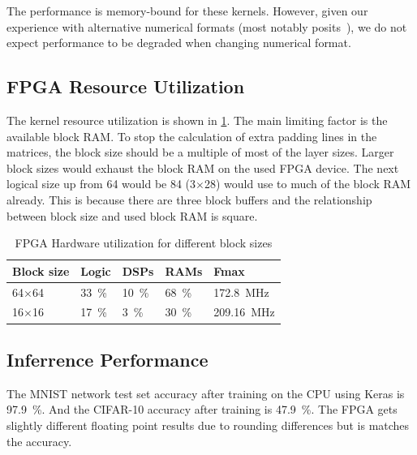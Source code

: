 \documentclass[techrep,english]{ipsj} %
\begin{document}
{The performance is memory-bound for these kernels. However, given our experience with alternative numerical formats (most notably posits~\cite{podobasposit}), we do not expect performance to be degraded when changing numerical format.

\subsection{FPGA Resource Utilization}
The kernel resource utilization is shown in \cref{tab:fpga-util}.
The main limiting factor is the available block RAM.
To stop the calculation of extra padding lines in the matrices, the block size should be a multiple of most of the layer sizes.
Larger block sizes would exhaust the block RAM on the used FPGA device.
The next logical size up from \num{64} would be \num{84} (\num{3}\(\times\)\num{28}) would use to much of the block RAM already.
This is because there are three block buffers and the relationship between block size and used block RAM is square.

\begin{table}[h]
  \centering
  \caption{FPGA Hardware utilization for different block sizes}\label{tab:fpga-util}
  \begin{tabular}{lllll}
    \toprule
    \textbf{Block size} & \textbf{Logic} & \textbf{DSPs} & \textbf{RAMs} & \textbf{Fmax} \\
    \midrule    
    64$\times$64 & \SI{33}{\percent} & \SI{10}{\percent} & \SI{68}{\percent} & \SI{172.8}{\mega\hertz}  \\ %
    16$\times$16 & \SI{17}{\percent} & \SI{3}{\percent} & \SI{30}{\percent} & \SI{209.16}{\mega\hertz}  \\ %
    \bottomrule
  \end{tabular}
\end{table}

\subsection{Inferrence Performance}
The MNIST network test set accuracy after training on the CPU using Keras is \SI{97.9}{\percent}.
And the CIFAR-10 accuracy after training is \SI{47.9}{\percent}.
The FPGA gets slightly different floating point results due to rounding differences but is matches the accuracy.

}
\end{document}
